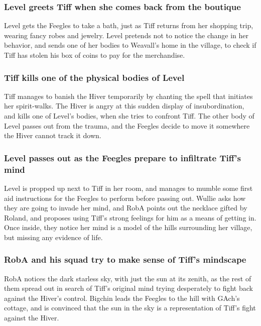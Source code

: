 \subsubsection{\Gls{Level} greets \Gls{Tiff} when she comes back from the boutique}
\Gls{Level} gets the Feegles to take a bath, just as \Gls{Tiff} returns from her shopping trip,
wearing fancy robes and jewelry. \Gls{Level} pretends not to notice the change in her behavior, and
sends one of her bodies to \Gls{Weavall}'s home in the village, to check if \Gls{Tiff} has stolen
his box of coins to pay for the merchandise.

\subsubsection{\Gls{Tiff} kills one of the physical bodies of \Gls{Level}}
\Gls{Tiff} manages to banish the \Gls{Hiver} temporarily by chanting the spell that initiates her
spirit-walks. The \Gls{Hiver} is angry at this sudden display of insubordination, and kills one of
\Gls{Level}'s bodies, when she tries to confront \Gls{Tiff}. The other body of \Gls{Level} passes
out from the trauma, and the Feegles decide to move it somewhere the \Gls{Hiver} cannot track it
down.

\subsubsection{\Gls{Level} passes out as the Feegles prepare to infiltrate \Gls{Tiff}'s mind}
\Gls{Level} is propped up next to \Gls{Tiff} in her room, and manages to mumble some first aid
instructions for the Feegles to perform before passing out. \Gls{Wullie} asks how they are going to
invade her mind, and \Gls{RobA} points out the necklace gifted by \Gls{Roland}, and proposes using
\Gls{Tiff}'s strong feelings for him as a means of getting in. Once inside, they notice her mind
is a model of the hills surrounding her village, but missing any evidence of life.

\subsubsection{\Gls{RobA} and his squad try to make sense of \Gls{Tiff}'s mindscape}
\Gls{RobA} notices the dark starless sky, with just the sun at its zenith, as the rest of them
spread out in search of \Gls{Tiff}'s original mind trying desperately to fight back against the
\Gls{Hiver}'s control. \Gls{Bigchin} leads the Feegles to the hill with \Gls{GAch}'s cottage, and
is convinced that the sun in the sky is a representation of \Gls{Tiff}'s fight against the
\Gls{Hiver}.

